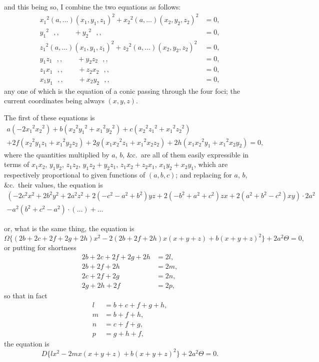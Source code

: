 \documentclass[11pt,a4paper]{article}
\begin{document}
\newpage
\setcounter{page}{507}

and this being so, I combine the two equations as follows:
\begin{align*}
x_1{}^2 (a, \ldots)(x_1, y_1, z_1)^2 + x_2{}^2 (a, \ldots)(x_2, y_2, z_2)^2 &= 0,\\
y_1{}^2 \,\,\,\, ,, \quad\quad + y_2{}^2 \,\,\,\, ,, \quad\quad &= 0,\\
z_1{}^2 (a, \ldots)(x_1, y_1, z_1)^2 + z_2{}^2 (a, \ldots)(x_2, y_2, z_2)^2 &= 0,\\
y_1z_1 \,\,\,\, ,, \quad\quad + y_2z_2 \,\,\,\, ,, \quad\quad &= 0,\\
z_1x_1 \,\,\,\, ,, \quad\quad + z_2x_2 \,\,\,\, ,, \quad\quad &= 0,\\
x_1y_1 \,\,\,\, ,, \quad\quad + x_2y_2 \,\,\,\, ,, \quad\quad &= 0,
\end{align*}
any one of which is the equation of a conic passing through the four foci; the current coordinates being always $(x, y, z)$.

The first of these equations is
\begin{multline*}
a(-2x_1{}^2x_2{}^2) + b(x_2{}^2y_1{}^2 + x_1{}^2y_2{}^2) + c(x_2{}^2z_1{}^2 + x_1{}^2z_2{}^2)\\
+ 2f(x_2{}^2y_1z_1 + x_1{}^2y_2z_2) + 2g(x_1x_2{}^2z_1 + x_1{}^2x_2z_2) + 2h(x_1x_2{}^2y_1 + x_1{}^2x_2y_2) = 0,
\end{multline*}
where the quantities multiplied by $a$, $b$, \&c.\ are all of them easily expressible in terms of $x_1x_2$, $y_1y_2$, $z_1z_2$, $y_1z_2 + y_2z_1$, $z_1x_2 + z_2x_1$, $x_1y_2 + x_2y_1$, which are respectively proportional to given functions of $(a, b, c)$; and replacing for $a$, $b$, \&c.\ their values, the equation is
\begin{multline*}
(-2c^2x^2 + 2b^2y^2 + 2a^2z^2 + 2(-c^2-a^2+b^2)yz + 2(-b^2+a^2+c^2)zx + 2(a^2+b^2-c^2)xy) \cdot 2a^2\\
- a^2(b^2+c^2-a^2)\cdot(\ldots) + \ldots
\end{multline*}

\newpage
\setcounter{page}{508}

or, what is the same thing, the equation is
\[
\Omega\{(2b + 2c + 2f + 2g + 2h)x^2 - 2(2b + 2f + 2h)x(x+y+z) + b(x+y+z)^2\} + 2a^2\Theta = 0,
\]
or putting for shortness
\begin{align*}
2b + 2c + 2f + 2g + 2h &= 2l,\\
2b + 2f + 2h &= 2m,\\
2c + 2f + 2g &= 2n,\\
2g + 2h + 2f &= 2p,
\end{align*}
so that in fact
\begin{align*}
l &= b+c+f+g+h,\\
m &= b+f+h,\\
n &= c+f+g,\\
p &= g+h+f,
\end{align*}
the equation is
\[
D\{lx^2 - 2mx(x+y+z) + b(x+y+z)^2\} + 2a^2\Theta = 0.
\]
\end{document}
